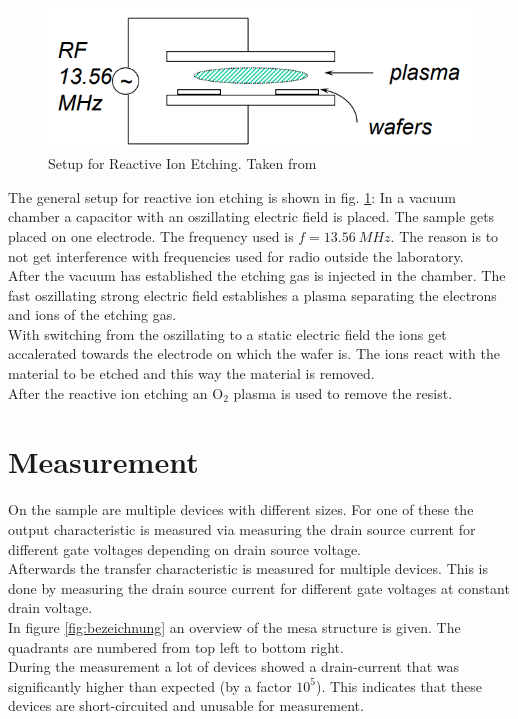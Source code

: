 \documentclass[%
 reprint,
amsmath,amssymb,
pra,
]{revtex4-1}
\begin{document}
\begin{figure}
\centering
\includegraphics[scale=0.5]{Bilder/Reactive_Ion_Etching.PNG}
\caption{Setup for Reactive Ion Etching. Taken from \cite{Cheung}}
\label{fig:Reactive_Ion_Etching}
\end{figure}

The general setup for reactive ion etching is shown in fig. \ref{fig:Reactive_Ion_Etching}: In a vacuum chamber a capacitor with an oszillating electric field is placed. The sample gets placed on one electrode. The frequency used is $f = \SI{13.56}{MHz}$. The reason is to not get interference with frequencies used for radio outside the laboratory. \\
After the vacuum has established the etching gas is injected in the chamber. The fast oszillating strong electric field establishes a plasma separating the electrons and ions of the etching gas. \\
With switching from the oszillating to a static electric field the ions get accalerated towards the electrode on which the wafer is. The ions react with the material to be etched and this way the material is removed. \\
After the reactive ion etching an O$_2$ plasma is used to remove the resist.


\section{Measurement}
On the sample are multiple devices with different sizes. For one of these the output characteristic is measured via measuring the drain source current for different gate voltages depending on drain source voltage. \\
Afterwards the transfer characteristic is measured for multiple devices. This is done by measuring the drain source current for different gate voltages at constant drain voltage.\\
In figure \ref{fig:bezeichnung} an overview of the mesa structure is given. The quadrants are numbered from top left to bottom right.\\
During the measurement a lot of devices showed a drain-current that was significantly higher than expected (by a factor $10^5$). This indicates that these devices are short-circuited and unusable for measurement.
\end{document}
